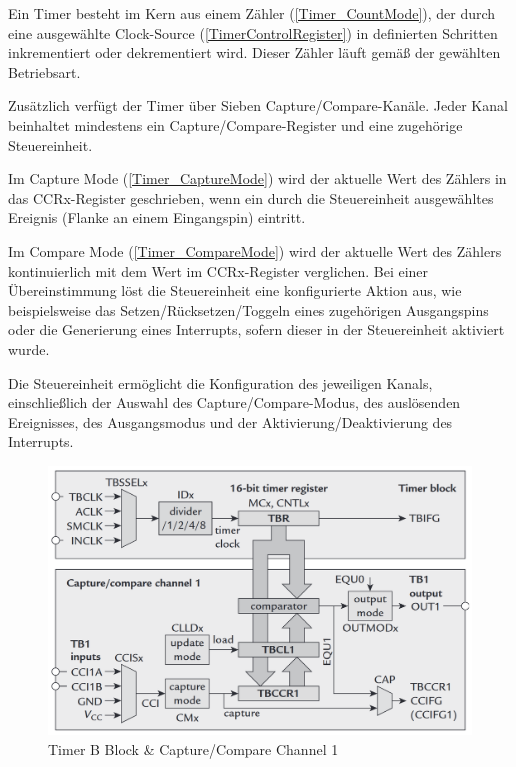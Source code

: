 Ein Timer besteht im Kern aus einem Z\"ahler (\ref{Timer_CountMode}), der durch eine ausgew\"ahlte Clock-Source (\ref{TimerControlRegister}) in definierten Schritten inkrementiert oder dekrementiert wird. Dieser Z\"ahler l\"auft gem\"a{\ss} der gew\"ahlten Betriebsart.

Zus\"atzlich verf\"ugt der Timer \"uber Sieben Capture/Compare-Kan\"ale. Jeder Kanal beinhaltet mindestens ein Capture/Compare-Register und eine zugeh\"orige Steuereinheit.

Im Capture Mode (\ref{Timer_CaptureMode}) wird der aktuelle Wert des Z\"ahlers in das CCRx-Register geschrieben, wenn ein durch die Steuereinheit ausgew\"ahltes Ereignis (\zB Flanke an einem Eingangspin) eintritt.

Im Compare Mode (\ref{Timer_CompareMode}) wird der aktuelle Wert des Z\"ahlers kontinuierlich mit dem Wert im CCRx-Register verglichen. Bei einer \"Ubereinstimmung l\"ost die Steuereinheit eine konfigurierte Aktion aus, wie beispielsweise das Setzen/R\"ucksetzen/Toggeln eines zugeh\"origen Ausgangspins oder die Generierung eines Interrupts, sofern dieser in der Steuereinheit aktiviert wurde.

Die Steuereinheit erm\"oglicht die Konfiguration des jeweiligen Kanals, einschließlich der Auswahl des Capture/Compare-Modus, des ausl\"osenden Ereignisses, des Ausgangsmodus und der Aktivierung/Deaktivierung des Interrupts.

\begin{figure}[h!]
	\centering
	\includegraphics[width=1.0\textwidth]{../Bilder/BlockDiagram_TimerB.png}
	\caption{Timer B Block \& Capture/Compare Channel 1\\}
	\label{fig:BlockDiagramm_Timer}
\end{figure}


